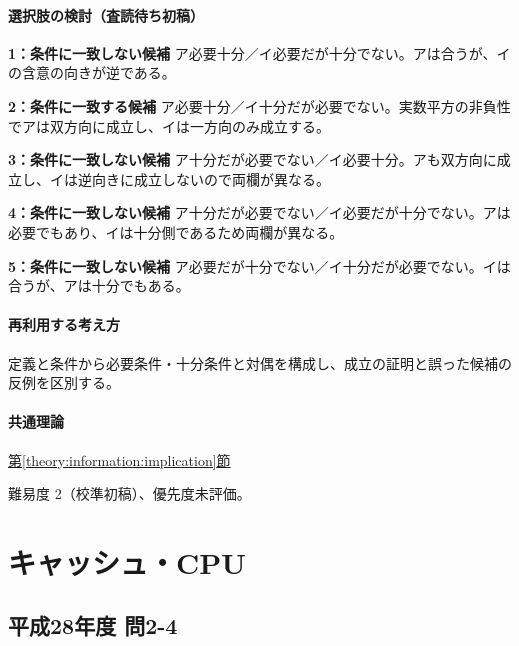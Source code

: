 \paragraph{選択肢の検討（査読待ち初稿）}\mbox{}\par

\noindent\textbf{1：条件に一致しない候補} ア必要十分／イ必要だが十分でない。アは合うが、イの含意の向きが逆である。\par

\noindent\textbf{2：条件に一致する候補} ア必要十分／イ十分だが必要でない。実数平方の非負性でアは双方向に成立し、イは一方向のみ成立する。\par

\noindent\textbf{3：条件に一致しない候補} ア十分だが必要でない／イ必要十分。アも双方向に成立し、イは逆向きに成立しないので両欄が異なる。\par

\noindent\textbf{4：条件に一致しない候補} ア十分だが必要でない／イ必要だが十分でない。アは必要でもあり、イは十分側であるため両欄が異なる。\par

\noindent\textbf{5：条件に一致しない候補} ア必要だが十分でない／イ十分だが必要でない。イは合うが、アは十分でもある。\par

\paragraph{再利用する考え方} 定義と条件から必要条件・十分条件と対偶を構成し、成立の証明と誤った候補の反例を区別する。

\paragraph{共通理論} \hyperref[theory:information:implication]{第\ref*{theory:information:implication}節}

\par 難易度 2（校準初稿）、優先度未評価。

\section{キャッシュ・CPU}

\subsection{平成28年度 問2-4}
\label{q:h28-reg-basic-2-4}

